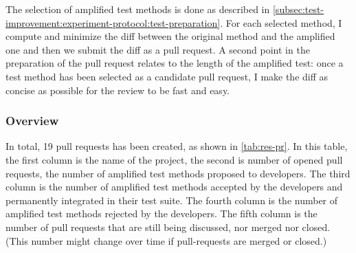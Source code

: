 The selection of amplified test methods is done as described in \autoref{subsec:test-improvement:experiment-protocol:test-preparation}.
For each selected  method, I compute and minimize the diff between the original method and the amplified one and then we submit the diff as a pull request.
A second point in the preparation of the pull request relates to the length of the amplified test: once a test method has been selected as a candidate pull request, I make the diff as concise as possible for the review to be fast and easy.

\subsubsection{Overview}

In total, 19 pull requests has been created, as shown in \autoref{tab:res-pr}. 
In this table, the first column is the name of the project, the second is number of opened pull requests, \ie the number of amplified test methods proposed to developers. 
The third column is the number of amplified test methods accepted by the developers and permanently integrated in their test suite. 
The fourth column is the number of amplified test methods rejected by the developers. 
The fifth column is the number of pull requests that are still being discussed, \ie nor merged nor closed. (This number might change over time if pull-requests are merged or closed.)

